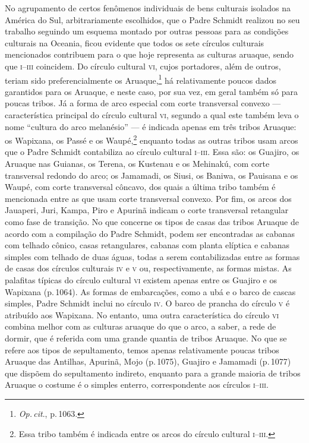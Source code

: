 No agrupamento de certos fenômenos individuais de bens culturais
isolados na América do Sul, arbitrariamente escolhidos, que o Padre
Schmidt realizou no seu trabalho seguindo um esquema montado por outras
pessoas para as condições culturais na Oceania, ficou evidente que
todos os sete círculos culturais mencionados contribuem para o que hoje
representa as culturas aruaque, sendo que \textsc{i--iii} coincidem. Do círculo
cultural \textsc{vi}, cujos portadores, além de outros, teriam sido
preferencialmente os Aruaque,\footnote{\textit{Op.\,cit}., p.\,1063.} há
relativamente poucos dados garantidos para os Aruaque, e neste caso,
por sua vez, em geral também só para poucas tribos. Já a forma de arco
especial com corte transversal convexo --- característica principal do
círculo cultural \textsc{vi}, segundo a qual este também leva o nome ``cultura do
arco melanésio'' --- é indicada apenas em três tribos Aruaque: os
Wapixana, os Passé e os Waupé,\footnote{Essa tribo também é indicada
  entre os arcos do círculo cultural \textsc{i--iii}.} enquanto todas as outras
tribos usam arcos que o Padre Schmidt contabiliza ao círculo cultural
\textsc{i--iii}. Essa são: os Guajiro, os Aruaque nas Guianas, os Terena, os
Kustenau e os Mehinakú, com corte transversal redondo do arco; os
Jamamadi, os Siusi, os Baniwa, os Pauisana e os Waupé, com corte
transversal côncavo, dos quais a última tribo também é mencionada entre
as que usam corte transversal convexo. Por fim, os arcos dos Jauaperi,
Juri, Kampa, Piro e Apurinã indicam o corte transversal retangular como
fase de transição. No que concerne os tipos de casas das tribos Aruaque
de acordo com a compilação do Padre Schmidt, podem ser encontradas as
cabanas com telhado cônico, casas retangulares, cabanas com planta
elíptica e cabanas simples com telhado de duas águas, todas a serem
contabilizadas entre as formas de casas dos círculos culturais \textsc{iv} e \textsc{v}
ou, respectivamente, as formas mistas. As palafitas típicas do círculo
cultural \textsc{vi} existem apenas entre os Guajiro e os Wapixana (p.\,1064). As
formas de embarcações, como a ubá e o barco de cascas simples, Padre
Schmidt inclui no círculo \textsc{iv}. O barco de prancha do círculo \textsc{v} é
atribuído aos Wapixana. No entanto, uma outra característica do círculo
\textsc{vi} combina melhor com as culturas aruaque do que o arco, a saber, a rede
de dormir, que é referida com uma grande quantia de tribos Aruaque. No
que se refere aos tipos de sepultamento, temos apenas relativamente
poucas tribos Aruaque das Antilhas, Apurinã, Mojo (p.\,1075),
Guajiro e Jamamadi (p.\,1077) que dispõem do sepultamento indireto,
enquanto para a grande maioria de tribos Aruaque o costume é o simples
enterro, correspondente aos círculos \textsc{i--iii}.

